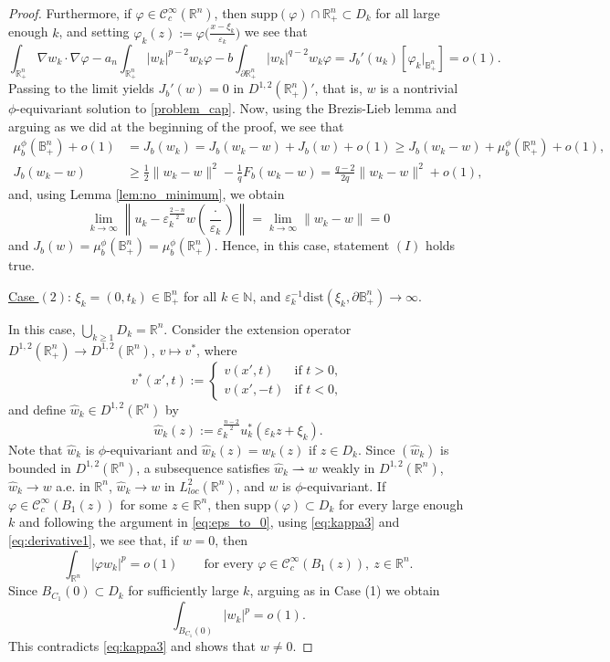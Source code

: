 \documentclass[10pt,a4paper]{amsart}
\def\D{\mathbb{B}^n_+}
\def\cC{\mathcal{C}}
\def\dist{\mathrm{dist}}
\def\eps{\varepsilon}
\def\hn{\mathbb{R}^n_+}
\def\idhn{\int_{\partial\hn}}
\def\ihn{\int_{\hn}}
\def\irn{\int_{\rn}}
\def\n{\mathbb{N}}
\def\rh{\rightharpoonup}
\def\rn{\mathbb{R}^n}
\def\supp{\mathrm{supp}}
\def\vp{\varphi}
\def\what{\widehat}
\begin{document}
\begin{proof}
Furthermore, if $\vp\in\cC^\infty_c(\rn)$, then $\supp(\vp)\cap\hn\subset D_k$ for all large enough $k$, and setting $\vp_k(z):=\vp\big(\frac{x-\xi_k}{\eps_k}\big)$ we see that
\begin{equation*}
\ihn\nabla w_k\cdot\nabla\vp-a_n\ihn|w_k|^{p-2}w_k\vp-b\idhn|w_k|^{q-2}w_k\vp = J_b'(u_k)[\vp_k|_{\D}]=o(1).
\end{equation*}
Passing to the limit yields $J_b'(w)=0$ in $D^{1,2}(\hn)'$, that is, $w$ is a nontrivial $\phi$-equivariant solution to \eqref{problem_cap}. Now, using the Brezis-Lieb lemma and arguing  as we did at the beginning of the proof, we see that
\begin{align}\label{eq:H1}
\mu^\phi_b(\D)+o(1)&=J_b(w_k)=J_b(w_k-w)+J_b(w)+o(1)\geq J_b(w_k-w)+\mu^\phi_b(\hn)+o(1), \\
J_b(w_k-w)&\geq\frac{1}{2}\|w_k-w\|^2-\frac{1}{q}F_b(w_k-w)=\frac{q-2}{2q}\|w_k-w\|^2+o(1),
\end{align}
and, using Lemma \ref{lem:no_minimum}, we obtain  
$$\lim_{k\to\infty}\left\|u_k-\eps_k^\frac{2-n}{2}w\left(\frac{\cdot}{\eps_k}\right)\right\|=\lim_{k\to\infty}\|w_k-w\| = 0$$
and $J_b(w)=\mu^\phi_b(\D)=\mu^\phi_b(\hn)$. Hence, in this case, statement $(I)$ holds true.

\underline{Case $(2)$}: $\xi_k=(0,t_k)\in\D$ for all $k\in\n$, and $\eps_k^{-1}\dist(\xi_k,\partial\D)\to\infty$.

In this case, $\bigcup_{k\geq 1}D_k=\rn$. Consider the extension operator $D^{1,2}(\hn)\to D^{1,2}(\rn)$,  $v\mapsto v^*$, where
\begin{equation*}
v^*(x',t):=
\begin{cases}
v(x',t) &\text{if \ }t>0,\\
v(x',-t) &\text{if \ }t<0,
\end{cases}
\end{equation*}
and define $\what w_k\in D^{1,2}(\rn)$ by
$$\what w_k(z):=\eps_k^\frac{n-2}{2}u_k^*(\eps_kz+\xi_k).$$
Note that $\what w_k$ is $\phi$-equivariant and $\what w_k(z)=w_k(z)$ if $z\in D_k$. Since $(\what w_k)$ is bounded in $D^{1,2}(\rn)$, a subsequence satisfies $\what w_k\rh w$ weakly in $D^{1,2}(\rn)$, $\what w_k\to w$ a.e. in $\rn$, $\what w_k\to w$ in $L^2_{loc}(\rn)$, and $w$ is $\phi$-equivariant. If $\vp\in\cC^\infty_c(B_1(z))$ for some $z\in\rn$, then $\supp(\vp)\subset D_k$ for every large enough $k$ and following the argument in \eqref{eq:eps_to_0}, using \eqref{eq:kappa3} and \eqref{eq:derivative1}, we see that, if $w=0$, then
$$\irn|\vp w_k|^p = o(1)\qquad\text{for every \ }\vp\in\cC^\infty_c(B_1(z)), \ z\in\rn.$$
Since $B_{C_1}(0)\subset D_k$ for sufficiently large $k$, arguing as in Case (1) we  obtain
$$\int_{B_{C_1}(0)}|w_k|^p=o(1).$$
This contradicts \eqref{eq:kappa3} and shows that $w\neq 0$.


\end{proof}
\end{document}
